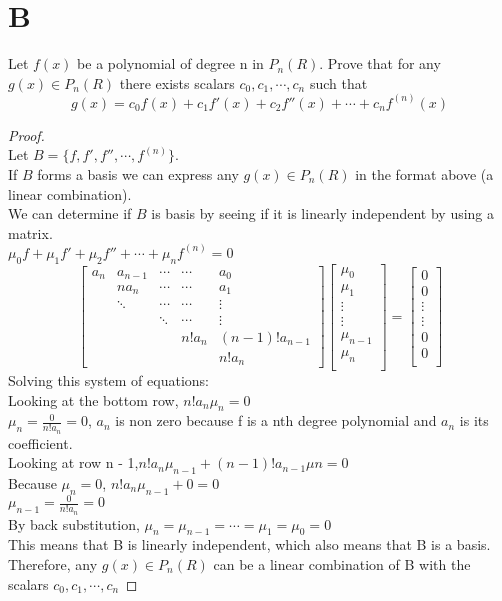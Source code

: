 \documentclass[11pt]{scrartcl}
\begin{document}
\section{B}
Let $f(x)$ be a polynomial of degree n in $P_n(R)$. Prove that for any $g(x) \in P_n(R)$ there exists scalars $c_0, c_1, \cdots, c_n$ such that
$$g(x) = c_0f(x) + c_1f'(x) + c_2f''(x) + \cdots + c_nf^{(n)}(x)$$
\begin{proof}
	\-\\
	Let $B = \{f, f', f'', \cdots, f^{(n)}\}$.\\
	If $B$ forms a basis we can express any $g(x) \in P_n(R)$ in the format above (a linear combination).\\
	We can determine if $B$ is basis by seeing if it is linearly independent by using a matrix.\\
	$\mu_0f + \mu_1f' + \mu_2f'' + \cdots + \mu_nf^{(n)} = 0$\\

	\[
	\begin{bmatrix}
	a_n & a_{n-1} & \cdots & \cdots & a_0 \\
  	& na_n & \cdots & \cdots & a_1\\
  	& \ddots & \cdots & \cdots & \vdots \\
 	& & \ddots & \cdots & \vdots \\
	& & & n!a_n & (n-1)!a_{n-1} \\
 	& & & & n!a_n
	\end{bmatrix}
	\begin{bmatrix}
		\mu_0\\
		\mu_1\\
		\vdots\\
		\vdots\\
		\mu_{n-1}\\
		\mu_{n}\\
	\end{bmatrix}
	=
	\begin{bmatrix}
		0\\
		0\\
		\vdots\\
		\vdots\\
		0\\
		0\\
	\end{bmatrix}
	\]
	Solving this system of equations:\\
	Looking at the bottom row, $n!a_n \mu_n = 0$\\
	$\mu_n = \frac{0}{n!a_n} = 0$, $a_n$ is non zero because f is a nth degree polynomial and $a_n$ is its coefficient.\\
	Looking at row n - 1,$n!a_n \mu_{n-1} + (n-1)!a_{n-1} \mu{n} = 0$\\
	Because $\mu_n = 0$, $n!a_n \mu_{n-1} + 0 = 0$\\
	$\mu_{n-1} = \frac{0}{n!a_n} = 0$\\
	By back substitution, $\mu_n = \mu_{n-1} = \cdots = \mu_1 = \mu_0 = 0$\\
	This means that B is linearly independent, which also means that B is a basis.\\
	Therefore, any $g(x) \in P_n(R)$ can be a linear combination of B with the scalars $c_0, c_1, \cdots, c_n$
\end{proof}
\end{document}
